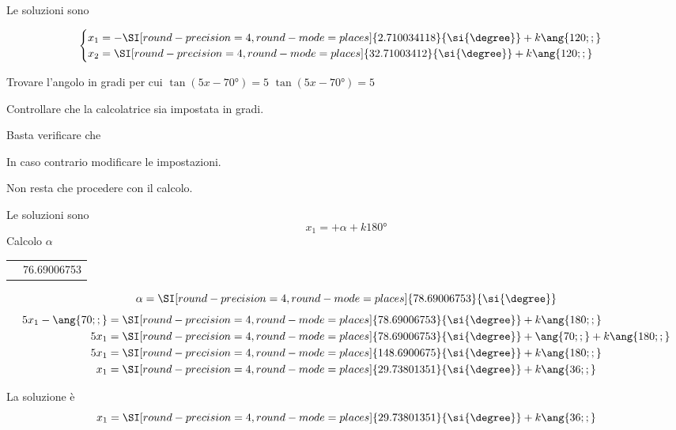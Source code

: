 \begin{exercise}
 	Le soluzioni sono
 	
 	\[\begin{cases}
x_1=-\SI[round-precision=\lungarrotandamento,round-mode=places]{2.710034118}{\si{\degree}}+k\ang{120;;}\\
x_2=\SI[round-precision=\lungarrotandamento,round-mode=places]{32.71003412}{\si{\degree}}+k\ang{120;;}\\
 	\end{cases}\]
 \end{exercise}
 \begin{exercise}
 	Trovare l'angolo in gradi per cui $\tan (5x-\ang{70;;})=5$
 	\tcblower
 	$\tan (5x-\ang{70;;})=5$
 	
 	Controllare che la calcolatrice sia impostata in gradi.
 	
 	Basta verificare che 
 	\testgradi
 	
 	In caso contrario modificare le impostazioni.
 	
 	Non resta che procedere con il calcolo.
 	
 	Le soluzioni sono 
 	\[x_1=+\alpha+k\ang{180;;}\]
 	Calcolo $\alpha$
 	\begin{center}
 		\begin{tabular}{ll}
 			\tastoitan\tasto{\num[round-precision=1,round-mode=places]{5}}
 			\tastouguale&\num[round-precision=\lungarrotandamento,round-mode=places]{76.69006753} 
 		\end{tabular} 
 	\end{center}
 	\[\alpha=\SI[round-precision=\lungarrotandamento,round-mode=places]{78.69006753}{\si{\degree}}\]
 	\begin{align*}
 	5x_1-\ang{70;;}&=\SI[round-precision=\lungarrotandamento,round-mode=places]{78.69006753}{\si{\degree}}+k\ang{180;;}\\
 	5x_1&=\SI[round-precision=\lungarrotandamento,round-mode=places]{78.69006753}{\si{\degree}}+\ang{70;;}+k\ang{180;;}\\
 	5x_1&=\SI[round-precision=\lungarrotandamento,round-mode=places]{148.6900675}{\si{\degree}}+k\ang{180;;}\\
 	x_1&=\SI[round-precision=\lungarrotandamento,round-mode=places]{29.73801351}{\si{\degree}}+k\ang{36;;}
 	\end{align*}
 	
 	La soluzione è
 \[x_1=\SI[round-precision=\lungarrotandamento,round-mode=places]{29.73801351}{\si{\degree}}+k\ang{36;;}\]
 \end{exercise}
